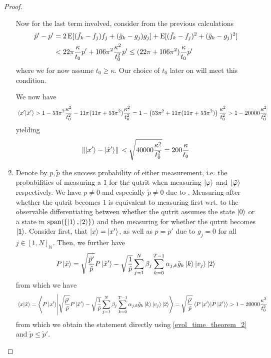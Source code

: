 \begin{proof}
\begin{enumerate}[label=(\roman*), wide]
        Now for the last term involved, consider from the previous calculations
        \begin{align}
            \tilde{p}'-p' &= 2\operatorname{E}[(\tilde{f}_k-f_j)f_j+(\tilde{g}_k-g_j)g_j] + \operatorname{E}[(\tilde{f}_k-f_j)^2+(\tilde{g}_k-g_j)^2]\\
            &< 22\pi\frac{\kappa}{t_0}p'+106\pi^2\frac{\kappa^2}{t_0^2}p' \leq (22\pi+106\pi^2)\frac{\kappa}{t_0}p'
        \end{align}
        where we for now assume \(t_0 \geq \kappa\). Our choice of \(t_0\) later on will meet this condition.

        We now have
        \begin{align}
            \braket*{x'}{\tilde{x}'} > 1 - 53 \pi^2 \frac{\kappa^2}{t_0^2} - 11 \pi (11\pi + 53\pi^2) \frac{\kappa^2}{t_0^2} = 1 - \left(53 \pi^2  + 11 \pi (11\pi + 53\pi^2)\right) \frac{\kappa^2}{t_0^2} > 1-20000\frac{\kappa^2}{t_0^2}
        \end{align}
        yielding
        \begin{align}
            \norm*{\ket{x'}-\ket{\tilde{x}'}} < \sqrt{40000\frac{\kappa^2}{t_0^2}} = 200\frac{\kappa}{t_0}
        \end{align}

        \item \label{evol_time_theorem_3} Denote by \(p, \tilde{p}\) the success probability of either measurement, i.e. the probabilities of measuring a \(1\) for the qutrit when measuring \(\ket{\varphi}\) and \(\ket*{\tilde{\varphi}}\) respectively. We have \(p \neq 0\) and especially \(\tilde{p} \neq 0\) due to . Measuring after whether the qutrit becomes \(1\) is equivalent to measuring first wrt. to the observable differentiating between whether the qutrit assumes the state \(\ket{0}\) or a state in \(\operatorname{span}(\{\ket{1}, \ket{2}\})\) and then measuring for whether the qutrit becomes \(\ket{1}\). Consider first, that \(\ket{x} = \ket{x'}\), as well as \(p = p'\) due to \(g_j = 0\) for all \(j \in [1, N]_{\mathbb{N}}\). Then, we further have
        \begin{align}
            P\ket*{\tilde{x}} = \sqrt{\frac{\tilde{p}'}{\tilde{p}}}P\ket*{\tilde{x}'}-\sqrt{\frac{1}{\tilde{p}}}\sum_{j=1}^N \beta_j \sum_{k=0}^{T-1} \alpha_{j, k} \tilde{g}_k \ket{k}\ket{v_j}\ket{2}
        \end{align}
        from which we have
        \begin{align}
            \braket*{x}{\tilde{x}} = \braket{P\ket{x'}}{\sqrt{\frac{\tilde{p}'}{\tilde{p}}}P\ket*{\tilde{x}'}-\sqrt{\frac{1}{\tilde{p}}}\sum_{j=1}^N \beta_j \sum_{k=0}^{T-1} \alpha_{j, k} \tilde{g}_k \ket{k}\ket{v_j}\ket{2}} = \sqrt{\frac{\tilde{p}'}{\tilde{p}}}\braket*{P\ket{x'}}{P\ket*{\tilde{x}'}} > 1-20000\frac{\kappa^2}{t_0^2}
        \end{align}
        from which we obtain the statement directly using \ref{evol_time_theorem_2} and \(\tilde{p} \leq \tilde{p}'\).
    \end{enumerate}
\end{proof}

